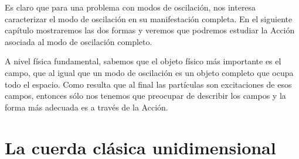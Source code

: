 Es claro que para una problema con modos de oscilación, nos interesa caracterizar el modo de oscilación en su manifestación completa. En el siguiente capítulo mostraremos las dos formas y veremos que  podremos  estudiar la Acción asociada al modo de oscilación completo.

A nivel física fundamental, sabemos que el objeto físico más importante es el campo, que al igual que un modo de oscilación es un objeto completo que ocupa todo el espacio.
Como resulta que al final las partículas son excitaciones de esos campos, entonces sólo nos tenemos que preocupar de describir los campos y la forma más adecuada es
a través de la Acción.


\section{La cuerda cl\'asica unidimensional}
\label{sec:la-cuerda-clasica}

